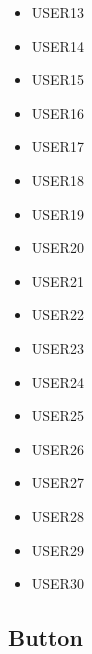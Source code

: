 \begin{itemize}
    \item USER13
    \item USER14
    \item USER15
    \item USER16
    \item USER17
    \item USER18
    \item USER19
    \item USER20
    \item USER21
    \item USER22
    \item USER23
    \item USER24
    \item USER25
    \item USER26
    \item USER27
    \item USER28
    \item USER29
    \item USER30
\end{itemize}

\subsection{Button} \label{subsec:button}


